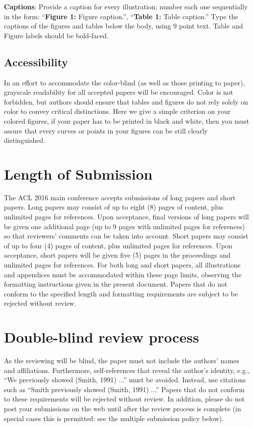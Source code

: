 \documentclass[11pt]{article}
\begin{document}
{\bf Captions}: Provide a caption for every illustration; number each one
sequentially in the form:  ``{\bf Figure 1:} Figure caption.'', ``{\bf Table 1:} Table caption.''  Type the captions of the figures and 
tables below the body, using 9 point text.  Table and Figure labels should be bold-faced.

\subsection{Accessibility}
\label{ssec:accessibility}

In an effort to accommodate the color-blind (as well as those printing
to paper), grayscale readability for all accepted papers will be
encouraged.  Color is not forbidden, but authors should ensure that
tables and figures do not rely solely on color to convey critical
distinctions.
Here we give a simple criterion on your colored figures, if your paper has to be printed in black and white, then you must assure that every curves or points in your figures can be still clearly distinguished.

\section{Length of Submission}
\label{sec:length}

The ACL 2016 main conference accepts submissions of long papers and short papers.  Long papers may consist of up to eight (8) pages of content, plus unlimited pages for references. Upon acceptance, final versions of long papers will be given one additional page (up to 9 pages with unlimited pages for references) so that reviewers' comments can be taken into account.  Short papers may consist of up to four (4) pages of content, plus unlimited pages for references. Upon acceptance, short papers will be given five (5) pages in the proceedings and unlimited pages for references.  For both long and short papers, all illustrations and appendices must be accommodated within these page limits, observing the formatting instructions given in the present document.  Papers that do not conform to the specified length and formatting requirements are subject to be rejected without review.


\section{Double-blind review process}
\label{sec:blind}

As the reviewing will be blind, the paper must not include the
authors' names and affiliations.  Furthermore, self-references that
reveal the author's identity, e.g., ``We previously showed (Smith,
1991) ...'' must be avoided. Instead, use citations such as ``Smith
previously showed (Smith, 1991) ...'' Papers that do not conform to
these requirements will be rejected without review. In addition,
please do not post your submissions on the web until after the
review process is complete (in special cases this is permitted: see 
the multiple submission policy below).
\end{document}
